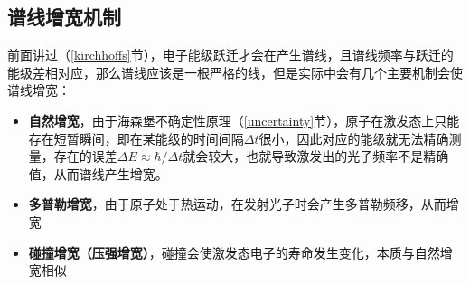 \subsection{谱线增宽机制}
前面讲过（\ref{kirchhoffs}节），电子能级跃迁才会在产生谱线，且谱线频率与跃迁的能级差相对应，那么谱线应该是一根严格的线，但是实际中会有几个主要机制会使谱线增宽：
\begin{itemize}
  \item \textbf{自然增宽}，由于海森堡不确定性原理（\ref{uncertainty}节），原子在激发态上只能存在短暂瞬间，即在某能级的时间间隔$\Delta t$很小，因此对应的能级就无法精确测量，存在的误差$\Delta E\approx\hbar/\Delta t$就会较大，也就导致激发出的光子频率不是精确值，从而谱线产生增宽。
  \item \textbf{多普勒增宽}，由于原子处于热运动，在发射光子时会产生多普勒频移，从而增宽
  \item \textbf{碰撞增宽（压强增宽）}，碰撞会使激发态电子的寿命发生变化，本质与自然增宽相似
\end{itemize}